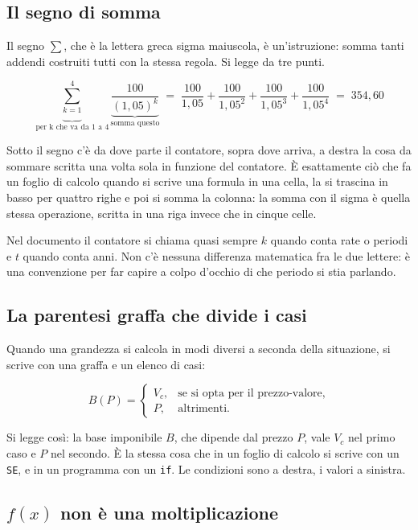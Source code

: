 \documentclass[11pt,a4paper]{article}
\theoremstyle{definition}
\theoremstyle{plain}
\begin{document}
\subsection{Il segno di somma}

Il segno $\sum$, che è la lettera greca sigma maiuscola, è un'istruzione: somma tanti addendi costruiti tutti con la stessa regola. Si legge da tre punti.

\[
\underbrace{\sum_{k=1}^{4}}_{\text{per k che va da 1 a 4}} \underbrace{\frac{100}{(1{,}05)^k}}_{\text{somma questo}}
\;=\;
\frac{100}{1{,}05} + \frac{100}{1{,}05^2} + \frac{100}{1{,}05^3} + \frac{100}{1{,}05^4}
\;=\; 354{,}60
\]

Sotto il segno c'è da dove parte il contatore, sopra dove arriva, a destra la cosa da sommare scritta una volta sola in funzione del contatore. È esattamente ciò che fa un foglio di calcolo quando si scrive una formula in una cella, la si trascina in basso per quattro righe e poi si somma la colonna: la somma con il sigma è quella stessa operazione, scritta in una riga invece che in cinque celle.

Nel documento il contatore si chiama quasi sempre $k$ quando conta rate o periodi e $t$ quando conta anni. Non c'è nessuna differenza matematica fra le due lettere: è una convenzione per far capire a colpo d'occhio di che periodo si stia parlando.

\subsection{La parentesi graffa che divide i casi}

Quando una grandezza si calcola in modi diversi a seconda della situazione, si scrive con una graffa e un elenco di casi:

\[
B(P) =
\begin{cases}
V_c, & \text{se si opta per il prezzo-valore},\\
P, & \text{altrimenti.}
\end{cases}
\]

Si legge così: la base imponibile $B$, che dipende dal prezzo $P$, vale $V_c$ nel primo caso e $P$ nel secondo. È la stessa cosa che in un foglio di calcolo si scrive con un \texttt{SE}, e in un programma con un \texttt{if}. Le condizioni sono a destra, i valori a sinistra.

\subsection{$f(x)$ non è una moltiplicazione}
\end{document}
